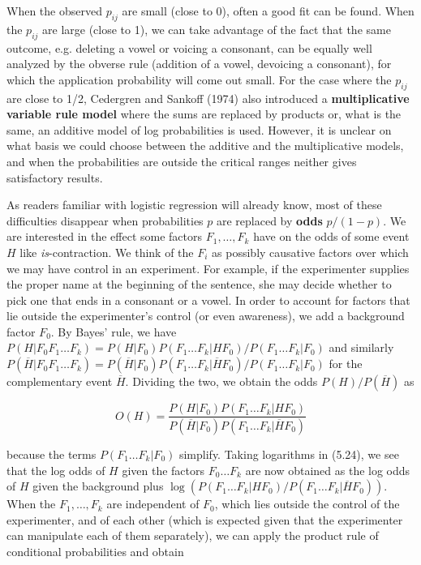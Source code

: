 When the observed $p_{ij}$ are small (close to 0), often a good fit can be
found. When the $p_{ij}$ are large (close to 1), we can take advantage of the
fact that the same outcome, e.g. deleting a vowel or voicing a consonant, can
be equally well analyzed by the obverse rule (addition of a vowel, devoicing a
consonant), for which the application probability will come out small. For the
case where the $p_{ij}$ are close to 1/2, Cedergren and Sankoff (1974) also
introduced a {\bf multiplicative variable rule model} where the sums are
replaced by products or, what is the same, an additive model of log
probabilities is used. However, it is unclear on what basis we could choose
between the additive and the multiplicative models, and when the probabilities
are outside the critical ranges neither gives satisfactory results. 

As readers familiar with logistic regression will already know, most of these
difficulties disappear when probabilities $p$ are replaced by {\bf odds}
$p/(1-p)$.  We are interested in the effect some factors
$F_1, \ldots , F_k$ have on the odds of some event $H$ like {\it
  is}-contraction. We think of the $F_i$ as possibly causative factors over
which we may have control in an experiment. For example, if the experimenter
supplies the proper name at the beginning of the sentence, she may decide
whether to pick one that ends in a consonant or a vowel. In order to account
for factors that lie outside the experimenter's control (or even awareness), we
add a background factor $F_0$. By Bayes' rule, we have $P(H|F_0 F_1\ldots F_k)
= P(H|F_0)P(F_1\ldots F_k|HF_0)/P(F_1\ldots F_k|F_0)$ and similarly
$P(\overline{H}|F_0 F_1\ldots F_k) = P(\overline{H}|F_0)P(F_1\ldots
F_k|\overline{H}F_0)/P(F_1\ldots F_k|F_0)$ for the complementary event
$\overline{H}$. Dividing the two, we obtain the odds $P(H)/P(\overline{H})$ as

\begin{equation}
O(H)=\frac{P(H|F_0)P(F_1\ldots F_k|HF_0)}{
P(\overline{H}|F_0)P(F_1\ldots F_k|\overline{H}F_0)}
\end{equation}

\noindent
because the terms $P(F_1\ldots F_k|F_0)$ simplify. Taking logarithms in (5.24),
we see that the log odds of $H$ given the factors $F_0\ldots F_k$ are now
obtained as the log odds of $H$ given the background plus $\log(P(F_1\ldots
F_k|HF_0)/P(F_1\ldots F_k|\overline{H}F_0))$. When the $F_1,\ldots,F_k$ are
independent of $F_0$, which lies outside the control of the experimenter, and
of each other (which is expected given that the experimenter can manipulate
each of them separately), we can apply the product rule of conditional
probabilities and obtain


